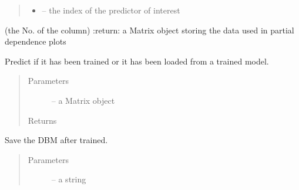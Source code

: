 \documentclass[letterpaper,10pt,english]{sphinxmanual}
\begin{document}
\begin{fulllineitems}
\begin{fulllineitems}
\begin{quote}
\begin{description}
\begin{itemize}
\item {} 
 -- the index of the predictor of interest

\end{itemize}

\end{description}\end{quote}

(the No. of the column)
:return: a Matrix object storing the data used in partial
dependence plots

\end{fulllineitems}


\begin{fulllineitems}
\label{\detokenize{index:dbm_py.interface.AUTO_DBM.predict}}
Predict if it has been trained or it has been loaded from
a trained model.
\begin{quote}\begin{description}
\item[{Parameters}] \leavevmode
{} -- a Matrix object

\item[{Returns}] \leavevmode


\end{description}\end{quote}

\end{fulllineitems}


\begin{fulllineitems}
\label{\detokenize{index:dbm_py.interface.AUTO_DBM.save}}
Save the DBM after trained.
\begin{quote}\begin{description}
\item[{Parameters}] \leavevmode
{} -- a string

\end{description}\end{quote}

\end{fulllineitems}



\end{fulllineitems}
\end{document}
